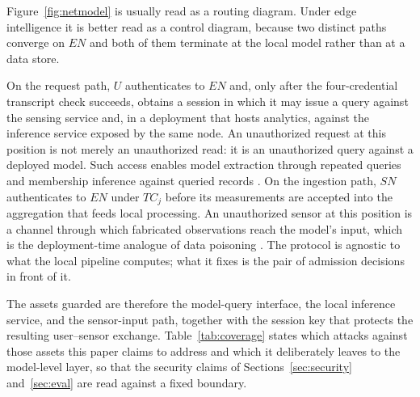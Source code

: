 \documentclass[cmc,article,submit,moreauthors,pdftex]{Definitions/tsp}
\begin{document}
Figure~\ref{fig:netmodel} is usually read as a routing diagram. Under edge intelligence it is better read as a control diagram, because two distinct paths converge on $EN$ and both of them terminate at the local model rather than at a data store.

On the request path, $U$ authenticates to $EN$ and, only after the four-credential transcript check succeeds, obtains a session in which it may issue a query against the sensing service and, in a deployment that hosts analytics, against the inference service exposed by the same node. An unauthorized request at this position is not merely an unauthorized read: it is an unauthorized query against a deployed model. Such access enables model extraction through repeated queries and membership inference against queried records \cite{tramer2016stealing,shokri2017membership}. On the ingestion path, $SN$ authenticates to $EN$ under $TC_j$ before its measurements are accepted into the aggregation that feeds local processing. An unauthorized sensor at this position is a channel through which fabricated observations reach the model's input, which is the deployment-time analogue of data poisoning \cite{nist2025aml,carlini2024poisoning}. The protocol is agnostic to what the local pipeline computes; what it fixes is the pair of admission decisions in front of it.

The assets guarded are therefore the model-query interface, the local inference service, and the sensor-input path, together with the session key that protects the resulting user--sensor exchange. Table~\ref{tab:coverage} states which attacks against those assets this paper claims to address and which it deliberately leaves to the model-level layer, so that the security claims of Sections~\ref{sec:security} and~\ref{sec:eval} are read against a fixed boundary.
\end{document}

